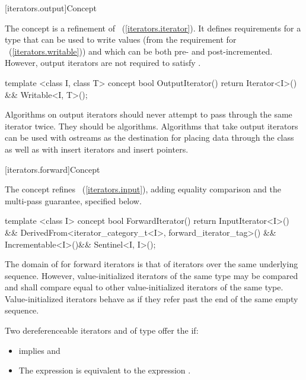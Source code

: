 [iterators.output]{Concept }

\pnum
The  concept is a refinement of
~(\ref{iterators.iterator}). It defines requirements for a type that
can be used to write values (from the requirement for
~(\ref{iterators.writable})) and which can be both pre- and post-incremented.
However, output iterators are not required to
satisfy .

%
\begin{codeblock}
  template <class I, class T>
  concept bool OutputIterator() {
    return Iterator<I>() && Writable<I, T>();
  }
\end{codeblock}

\pnum
\enternote
Algorithms on output iterators should never attempt to pass through the same iterator twice.
They should be
algorithms.
Algorithms that take output iterators can be used with ostreams as the destination
for placing data through the
class as well as with insert iterators and insert pointers.
\exitnote

[iterators.forward]{Concept }

\pnum
The  concept refines ~(\ref{iterators.input}),
adding equality comparison and the multi-pass guarantee, specified below.

%
\begin{codeblock}
  template <class I>
  concept bool ForwardIterator() {
    return InputIterator<I>() &&
      DerivedFrom<iterator_category_t<I>, forward_iterator_tag>() &&
      Incrementable<I>()&&
      Sentinel<I, I>();
  }
\end{codeblock}

\pnum
The domain of \tcode{==} for forward iterators is that of iterators over the same
underlying sequence. However, value-initialized iterators of the same type
may be compared and shall compare equal to other value-initialized iterators of the same type.
\enternote Value-initialized iterators behave as if they refer past the end of
the same empty sequence. \exitnote

\pnum
Two dereferenceable iterators  and  of type  offer the
 if:

\begin{itemize}
\item {} implies  and
\item The expression
 is equivalent to the expression .
\end{itemize}

